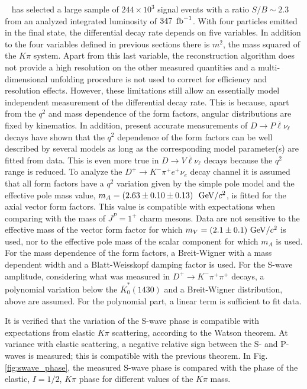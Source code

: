 \babar~\cite{delAmoSanchez:2010fd} has selected a large sample of $244\times 10^3$ signal events with a ratio $S/B\sim 2.3$ from an analyzed integrated
luminosity of $347~\mbox{\,fb}^{-1}$. With four particles emitted in the final state, 
the differential decay rate depends on five variables.
In addition to the four variables defined in previous sections there is 
$m^2$, the mass squared of the $K\pi$ system.
Apart from this last variable, the reconstruction algorithm does not provide 
a high resolution on the other measured quantities 
and a multi-dimensional unfolding procedure
is not used to correct for efficiency and resolution effects. However, these
limitations still allow an essentially model independent measurement of
the differential decay rate. This is because, apart from the $q^2$
and mass dependence of the form factors, angular distributions are fixed by
kinematics. In addition, present accurate measurements of 
$D \rightarrow P \overline{\ell}\nu_{\ell}$ decays have shown that the 
$q^2$ dependence of the form factors can be well described by several models
as long as the corresponding model parameter(s) are fitted from data.
This is even more true in $D \rightarrow V \overline{\ell}\nu_{\ell}$ decays
because the $q^2$ range is reduced. To analyze the
$D^+ \rightarrow K^- \pi^+ e^+ \nu_e$ decay channel it is assumed
that all form factors have a $q^2$ variation given by
the simple pole model and the effective pole mass value,
$m_A=(2.63 \pm 0.10 \pm 0.13)~{\rm~GeV}/c^2$,
is fitted for the axial vector form factors. This value is compatible
with expectations when comparing with the mass
of $J^P=1^+$ charm mesons. Data are not sensitive to the effective mass
of the vector form factor for which $m_V=(2.1 \pm 0.1)~{\rm GeV}/c^2$ is used,
nor to the effective pole mass of the scalar component for which $m_A$ is used.
 For the mass dependence of the form factors,
a Breit-Wigner with a mass dependent width and a Blatt-Weisskopf damping factor
is used. For the S-wave amplitude, considering
what was measured in $D^+ \rightarrow K^- \pi^+\pi^+$ decays,
a polynomial variation below the $\overline{K}^*_0(1430)$
and a Breit-Wigner distribution, above are assumed. For the polynomial part, 
a linear term is sufficient to fit data.

It is verified that the variation of the S-wave phase is compatible 
with expectations from elastic $K\pi$ scattering, according
to the Watson theorem. At variance with elastic scattering, 
a negative relative sign between the S- and P-waves is measured; 
this is compatible with 
the previous theorem. In Fig. \ref{fig:swave_phase}, the measured
S-wave phase is compared with the phase of the elastic, $I=1/2$,
$K\pi$ phase for different values of the $K\pi$ mass.

